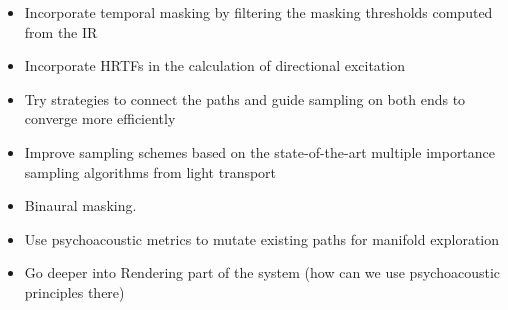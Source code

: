 


\begin{itemize}
\item Incorporate temporal masking by filtering the masking thresholds computed from the IR

\item Incorporate HRTFs in the calculation of directional excitation

\item Try strategies to connect the paths and guide sampling on both ends to converge more efficiently

\item Improve sampling schemes based on the state-of-the-art multiple importance sampling algorithms from light transport

\item Binaural masking.

\item Use psychoacoustic metrics to mutate existing paths for manifold exploration

\item Go deeper into Rendering part of the system (how can we use psychoacoustic principles there)

\end{itemize}
